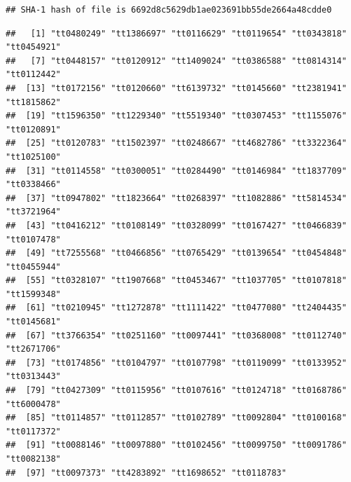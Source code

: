\documentclass[
]{article}
\newenvironment{Shaded}{\begin{snugshade}}{\end{snugshade}}
\newcommand{\CommentTok}[1]{\textcolor[rgb]{0.56,0.35,0.01}{\textit{#1}}}
\newcommand{\DecValTok}[1]{\textcolor[rgb]{0.00,0.00,0.81}{#1}}
\newcommand{\FloatTok}[1]{\textcolor[rgb]{0.00,0.00,0.81}{#1}}
\newcommand{\KeywordTok}[1]{\textcolor[rgb]{0.13,0.29,0.53}{\textbf{#1}}}
\newcommand{\NormalTok}[1]{#1}
\newcommand{\OperatorTok}[1]{\textcolor[rgb]{0.81,0.36,0.00}{\textbf{#1}}}
\newcommand{\OtherTok}[1]{\textcolor[rgb]{0.56,0.35,0.01}{#1}}
\newcommand{\StringTok}[1]{\textcolor[rgb]{0.31,0.60,0.02}{#1}}
\begin{document}
\begin{verbatim}
## SHA-1 hash of file is 6692d8c5629db1ae023691bb55de2664a48cdde0
\end{verbatim}

\begin{Shaded}
\end{Shaded}

\begin{verbatim}
##   [1] "tt0480249" "tt1386697" "tt0116629" "tt0119654" "tt0343818" "tt0454921"
##   [7] "tt0448157" "tt0120912" "tt1409024" "tt0386588" "tt0814314" "tt0112442"
##  [13] "tt0172156" "tt0120660" "tt6139732" "tt0145660" "tt2381941" "tt1815862"
##  [19] "tt1596350" "tt1229340" "tt5519340" "tt0307453" "tt1155076" "tt0120891"
##  [25] "tt0120783" "tt1502397" "tt0248667" "tt4682786" "tt3322364" "tt1025100"
##  [31] "tt0114558" "tt0300051" "tt0284490" "tt0146984" "tt1837709" "tt0338466"
##  [37] "tt0947802" "tt1823664" "tt0268397" "tt1082886" "tt5814534" "tt3721964"
##  [43] "tt0416212" "tt0108149" "tt0328099" "tt0167427" "tt0466839" "tt0107478"
##  [49] "tt7255568" "tt0466856" "tt0765429" "tt0139654" "tt0454848" "tt0455944"
##  [55] "tt0328107" "tt1907668" "tt0453467" "tt1037705" "tt0107818" "tt1599348"
##  [61] "tt0210945" "tt1272878" "tt1111422" "tt0477080" "tt2404435" "tt0145681"
##  [67] "tt3766354" "tt0251160" "tt0097441" "tt0368008" "tt0112740" "tt2671706"
##  [73] "tt0174856" "tt0104797" "tt0107798" "tt0119099" "tt0133952" "tt0313443"
##  [79] "tt0427309" "tt0115956" "tt0107616" "tt0124718" "tt0168786" "tt6000478"
##  [85] "tt0114857" "tt0112857" "tt0102789" "tt0092804" "tt0100168" "tt0117372"
##  [91] "tt0088146" "tt0097880" "tt0102456" "tt0099750" "tt0091786" "tt0082138"
##  [97] "tt0097373" "tt4283892" "tt1698652" "tt0118783"
\end{verbatim}

\begin{Shaded}
\end{Shaded}
\end{document}
